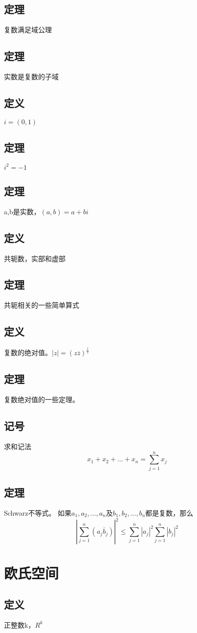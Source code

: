 \section{定理}复数满足域公理
\section{定理}实数是复数的子域
\section{定义} $i = (0, 1) $
\section{定理} $i^2 = -1 $
\section{定理} a,b是实数，$(a, b) = a + bi$
\section{定义} 共轭数，实部和虚部
\section{定理} 共轭相关的一些简单算式
\section{定义} 复数的绝对值。$ | z | = (z\overline{z})^{\frac{1}{2}} $
\section{定理} 复数绝对值的一些定理。
\section{记号} 求和记法 $$ x_1 + x_2 + ... + x_n = \sum_{j=1}^{n}x_j $$
\section{定理} Schwarz不等式。
如果$ a_1,a_2,...,a_n $及$ b_1,b_2,...,b_n $都是复数，那么 $$ |\sum_{j=1}^{n}(a_j\overline{b}_j)|^2 \leq \sum_{j=1}^{n}|a_j|^2 \sum_{j=1}^{n}|b_j|^2$$
\subparagraph*{}
\chapter*{欧氏空间}
\section{定义}正整数k，$ R^k $
